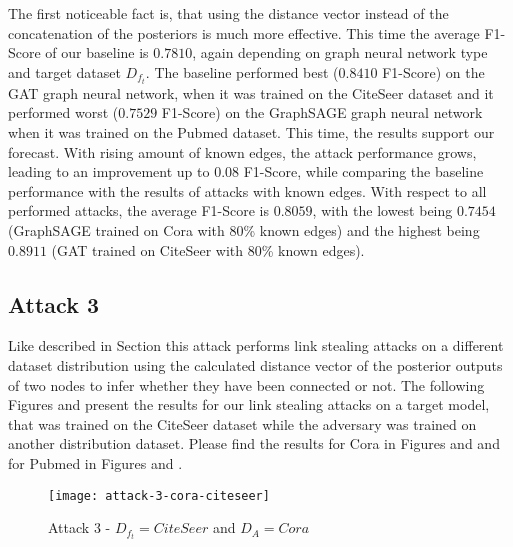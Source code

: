             The first noticeable fact is, that using the distance vector instead of the concatenation of the posteriors is much more effective.
            This time the average F1-Score of our baseline is $0.7810$, again depending on graph neural network type and target dataset $D_{f_t}$.
            The baseline performed best ($0.8410$ F1-Score) on the GAT graph neural network, when it was trained on the  CiteSeer dataset and it performed worst ($0.7529$ F1-Score) on the GraphSAGE graph neural network when it was trained on the Pubmed dataset.
            This time, the results support our forecast.
            With rising amount of known edges, the attack performance grows, leading to an improvement up to $0.08$ F1-Score, while comparing the baseline performance with the results of attacks with known edges.
            With respect to all performed attacks, the average F1-Score is $0.8059$, with the lowest being $0.7454$ (GraphSAGE trained on Cora with 80\% known edges) and the highest being $0.8911$ (GAT trained on CiteSeer with 80\% known edges).

        \subsection*{Attack 3}
            Like described in Section  this attack performs link stealing attacks on a different dataset distribution using the calculated distance vector of the posterior outputs of two nodes to infer whether they have been connected or not. 
            The following Figures  and  present the results for our link stealing attacks on a target model, that was trained on the CiteSeer dataset while the adversary was trained on another distribution dataset.
            Please find the results for Cora in Figures  and  and for Pubmed in Figures  and .

            \begin{figure}[h]
                \begin{center}
                    \texttt{[image: attack-3-cora-citeseer]}
                    \caption{Attack 3 - $D_{f_t} = CiteSeer$ and $D_A = Cora$}
                    \label{figure:eval-att3-cora-citeseer}
                \end{center}
            \end{figure}

